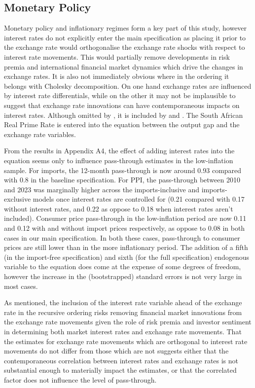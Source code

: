 \documentclass[12pt]{article}
\begin{document}
\subsection{Monetary Policy}

Monetary policy and inflationary regimes form a key part of this study, however interest rates do not explicitly enter the main specification as placing it prior to the exchange rate would orthogonalise the exchange rate shocks with respect to interest rate movements. This would partially remove developments in risk premia and international financial market dynamics which drive the changes in exchange rates. It is also not immediately obvious where in the ordering it belongs with Cholesky decomposition. On one hand exchange rates are influenced by interest rate differentials, while on the other it may not be implausible to suggest that exchange rate innovations can have contemporaneous impacts on interest rates. Although omitted by \textcite{mccarthy1999}, it is included by \textcite{hahn2003} and \textcite{cazorzi2007}. The South African Real Prime Rate is entered into the equation between the output gap and the exchange rate variables. 

From the results in Appendix A4, the effect of adding interest rates into the equation seems only to influence pass-through estimates in the low-inflation sample. For imports, the 12-month pass-through is now around 0.93 compared with 0.8 in the baseline specification. For PPI, the pass-through between 2010 and 2023 was marginally higher across the imports-inclusive and imports-exclusive models once interest rates are controlled for (0.21 compared with 0.17 without interest rates, and 0.22 as oppose to 0.18 when interest rates aren't included). Consumer price pass-through in the low-inflation period are now 0.11 and 0.12 with and without import prices respectively, as oppose to 0.08 in both cases in our main specification. In both these cases, pass-through to consumer prices are still lower than in the more inflationary period. The addition of a fifth (in the import-free specification) and sixth (for the full specification) endogenous variable to the equation does come at the expense of some degrees of freedom, however the increase in the (bootstrapped) standard errors is not very large in most cases. 

As mentioned, the inclusion of the interest rate variable ahead of the exchange rate in the recursive ordering risks removing financial market innovations from the exchange rate movements given the role of risk premia and investor sentiment in determining both market interest rates and exchange rate movements. That the estimates for exchange rate movements which are orthogonal to interest rate movements do not differ from those which are not suggests either that the contemporaneous correlation between interest rates and exchange rates is not substantial enough to materially impact the estimates, or that the correlated factor does not influence the level of pass-through. 
\end{document}
